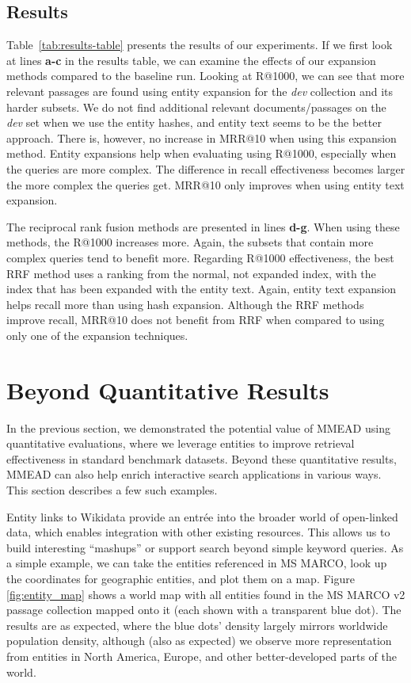 \subsection{Results}
Table~\ref{tab:results-table} presents the results of our experiments. If we first look at lines \textbf{a-c} in the results table, we can examine the effects of our expansion methods compared to the baseline run. Looking at R@1000, we can see that more relevant passages are found using entity expansion for the \emph{dev} collection and its harder subsets. We do not find additional relevant documents/passages on the \emph{dev} set when we use the entity hashes, and entity text seems to be the better approach. There is, however, no increase in MRR@10 when using this expansion method. Entity expansions help when evaluating using R@1000, especially when the queries are more complex. The difference in recall effectiveness becomes larger the more complex the queries get. MRR@10 only improves when using entity text expansion.

The reciprocal rank fusion methods are presented in lines \textbf{d-g}. When using these methods, the R@1000 increases more. Again, the subsets that contain more complex queries tend to benefit more. Regarding R@1000 effectiveness, the best RRF method uses a ranking from the normal, not expanded index, with the index that has been expanded with the entity text. Again, entity text expansion helps recall more than using hash expansion. Although the RRF methods improve recall, MRR@10 does not benefit from RRF when compared to using only one of the expansion techniques. 

\section{Beyond Quantitative Results}

In the previous section, we demonstrated the potential value of MMEAD using quantitative evaluations, where we leverage entities to improve retrieval effectiveness in standard benchmark datasets.
Beyond these quantitative results, MMEAD can also help enrich interactive search applications in various ways.
This section describes a few such examples.

Entity links to Wikidata provide an entr\'ee into the broader world of open-linked data, which enables integration with other existing resources.
This allows us to build interesting ``mashups'' or support search beyond simple keyword queries.
As a simple example, we can take the entities referenced in MS MARCO, look up the coordinates for geographic entities, and plot them on a map. 
Figure \ref{fig:entity_map} shows a world map with all entities found in the MS MARCO v2 passage collection mapped onto it (each shown with a transparent blue dot).
The results are as expected, where the blue dots' density largely mirrors worldwide population density, although (also as expected) we observe more representation from entities in North America, Europe, and other better-developed parts of the world.


